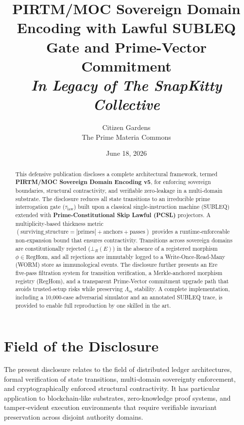 \documentclass[11pt,a4paper]{article}
\title{\bfseries PIRTM/MOC Sovereign Domain Encoding with Lawful SUBLEQ Gate and Prime-Vector Commitment\\[3mm]
\large\textit {In Legacy of The SnapKitty Collective}}
\author{Citizen Gardens \\ The Prime Materia Commons}\\[2mm]
\date{June 18, 2026}
\theoremstyle{definition}
\theoremstyle{remark}
\begin{document}
\maketitle
\begin{abstract}
\label{sec:abstract}
This defensive publication discloses a complete architectural framework, termed \textbf{PIRTM/MOC Sovereign Domain Encoding v5}, for enforcing sovereign boundaries, structural contractivity, and verifiable zero‑leakage in a multi‑domain substrate. The disclosure reduces all state transitions to an irreducible prime interrogation gate ($\tau_\text{law}$) built upon a classical single‑instruction machine (SUBLEQ) extended with \textbf{Prime‑Constitutional Skip Lawful (PCSL)} projectors. A multiplicity‑based thickness metric $(\text{surviving\_structure} = |\text{primes}| + \text{anchors} + \text{passes})$ provides a runtime‑enforceable non‑expansion bound that ensures contractivity. Transitions across sovereign domains are constitutionally rejected ($\bot_R(E)$) in the absence of a registered morphism $\phi \in \text{RegHom}$, and all rejections are immutably logged to a Write‑Once‑Read‑Many (WORM) store as immunological events. The disclosure further presents an Ere five‑pass filtration system for transition verification, a Merkle‑anchored morphism registry (RegHom), and a transparent Prime‑Vector commitment upgrade path that avoids trusted‑setup risks while preserving $\Lambda_m$ stability. A complete implementation, including a 10,000‑case adversarial simulator and an annotated SUBLEQ trace, is provided to enable full reproduction by one skilled in the art.
\end{abstract}
\newpage
\tableofcontents
\newpage


\section{Field of the Disclosure}
\label{sec:field}
The present disclosure relates to the field of distributed ledger architectures, formal verification of state transitions, multi‑domain sovereignty enforcement, and cryptographically enforced structural contractivity. It has particular application to blockchain‑like substrates, zero‑knowledge proof systems, and tamper‑evident execution environments that require verifiable invariant preservation across disjoint authority domains.
\end{document}

